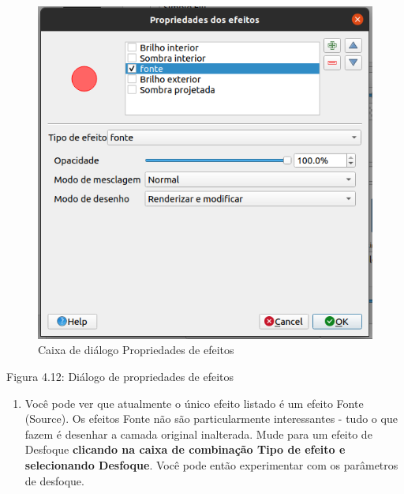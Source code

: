 \documentclass[
]{book}
\providecommand{\tightlist}{%
  \setlength{\itemsep}{0pt}\setlength{\parskip}{0pt}}
\begin{document}
\begin{figure}
\centering
\includegraphics{media/modulo4/new-effects-dialog.png}
\caption{Caixa de diálogo Propriedades de efeitos}
\end{figure}

Figura 4.12: Diálogo de propriedades de efeitos

\begin{enumerate}
\def\labelenumi{\arabic{enumi}.}
\setcounter{enumi}{3}
\tightlist
\item
  Você pode ver que atualmente o único efeito listado é um efeito Fonte (Source). Os efeitos Fonte não são particularmente interessantes - tudo o que fazem é desenhar a camada original inalterada. Mude para um efeito de Desfoque \textbf{clicando na caixa de combinação Tipo de efeito e selecionando Desfoque}. Você pode então experimentar com os parâmetros de desfoque.
\end{enumerate}
\end{document}
